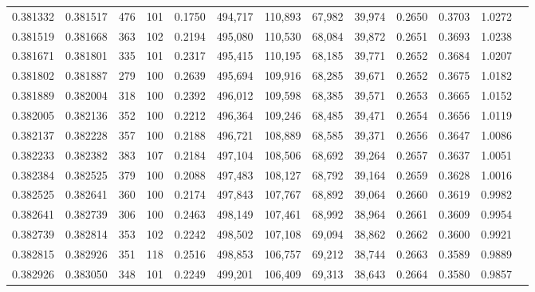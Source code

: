 \begin{tabular}{rrrrrrrrrrrrr}
0.381332 & 0.381517 &   476 & 101 &                                     0.1750 & 494,717 & 110,893 &  67,982 &  39,974 & 0.2650 & 0.3703 & 1.0272 \\
0.381519 & 0.381668 &   363 & 102 &                                     0.2194 & 495,080 & 110,530 &  68,084 &  39,872 & 0.2651 & 0.3693 & 1.0238 \\
0.381671 & 0.381801 &   335 & 101 &                                     0.2317 & 495,415 & 110,195 &  68,185 &  39,771 & 0.2652 & 0.3684 & 1.0207 \\
0.381802 & 0.381887 &   279 & 100 &                                     0.2639 & 495,694 & 109,916 &  68,285 &  39,671 & 0.2652 & 0.3675 & 1.0182 \\
0.381889 & 0.382004 &   318 & 100 &                                     0.2392 & 496,012 & 109,598 &  68,385 &  39,571 & 0.2653 & 0.3665 & 1.0152 \\
0.382005 & 0.382136 &   352 & 100 &                                     0.2212 & 496,364 & 109,246 &  68,485 &  39,471 & 0.2654 & 0.3656 & 1.0119 \\
0.382137 & 0.382228 &   357 & 100 &                                     0.2188 & 496,721 & 108,889 &  68,585 &  39,371 & 0.2656 & 0.3647 & 1.0086 \\
0.382233 & 0.382382 &   383 & 107 &                                     0.2184 & 497,104 & 108,506 &  68,692 &  39,264 & 0.2657 & 0.3637 & 1.0051 \\
0.382384 & 0.382525 &   379 & 100 &                                     0.2088 & 497,483 & 108,127 &  68,792 &  39,164 & 0.2659 & 0.3628 & 1.0016 \\
0.382525 & 0.382641 &   360 & 100 &                                     0.2174 & 497,843 & 107,767 &  68,892 &  39,064 & 0.2660 & 0.3619 & 0.9982 \\
0.382641 & 0.382739 &   306 & 100 &                                     0.2463 & 498,149 & 107,461 &  68,992 &  38,964 & 0.2661 & 0.3609 & 0.9954 \\
0.382739 & 0.382814 &   353 & 102 &                                     0.2242 & 498,502 & 107,108 &  69,094 &  38,862 & 0.2662 & 0.3600 & 0.9921 \\
0.382815 & 0.382926 &   351 & 118 &                                     0.2516 & 498,853 & 106,757 &  69,212 &  38,744 & 0.2663 & 0.3589 & 0.9889 \\
0.382926 & 0.383050 &   348 & 101 &                                     0.2249 & 499,201 & 106,409 &  69,313 &  38,643 & 0.2664 & 0.3580 & 0.9857 \\

\end{tabular}
